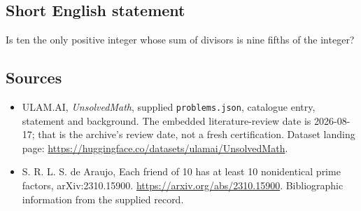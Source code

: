 \documentclass[11pt,a4paper]{article}
\begin{document}
\subsection{Short English statement}

Is ten the only positive integer whose sum of divisors is nine fifths of the integer?

\subsection{Sources}

{\small

\begin{itemize}

\item[\hypertarget{source:statement:1}{S1}] ULAM.AI, \emph{UnsolvedMath}, supplied \texttt{problems.json}, catalogue entry, statement and background. The embedded literature-review date is 2026-08-17; that is the archive’s review date, not a fresh certification. Dataset landing page: \url{https://huggingface.co/datasets/ulamai/UnsolvedMath}.

\item[\hypertarget{source:statement:2}{S2}] S. R. L. S. de Araujo, Each friend of 10 has at least 10 nonidentical prime factors, arXiv:2310.15900. \url{https://arxiv.org/abs/2310.15900}. Bibliographic information from the supplied record.

\end{itemize}

}

\label{end:statement}
\end{document}
